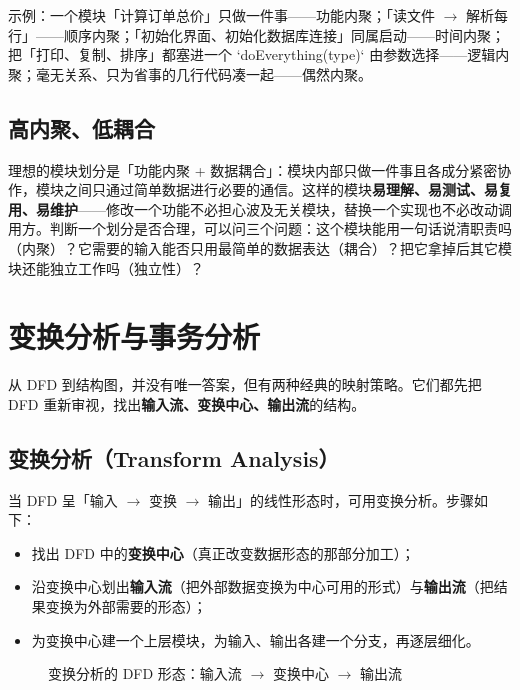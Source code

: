 示例：一个模块「计算订单总价」只做一件事——功能内聚；「读文件 $\to$ 解析每行」——顺序内聚；「初始化界面、初始化数据库连接」同属启动——时间内聚；把「打印、复制、排序」都塞进一个 `doEverything(type)` 由参数选择——逻辑内聚；毫无关系、只为省事的几行代码凑一起——偶然内聚。

\subsection{高内聚、低耦合}

理想的模块划分是「功能内聚 + 数据耦合」：模块内部只做一件事且各成分紧密协作，模块之间只通过简单数据进行必要的通信。这样的模块\textbf{易理解、易测试、易复用、易维护}——修改一个功能不必担心波及无关模块，替换一个实现也不必改动调用方。判断一个划分是否合理，可以问三个问题：这个模块能用一句话说清职责吗（内聚）？它需要的输入能否只用最简单的数据表达（耦合）？把它拿掉后其它模块还能独立工作吗（独立性）？

\section{变换分析与事务分析}

从 DFD 到结构图，并没有唯一答案，但有两种经典的映射策略。它们都先把 DFD 重新审视，找出\textbf{输入流、变换中心、输出流}的结构。

\subsection{变换分析（Transform Analysis）}

当 DFD 呈「输入 $\to$ 变换 $\to$ 输出」的线性形态时，可用变换分析。步骤如下：

\begin{itemize}
    \item 找出 DFD 中的\textbf{变换中心}（真正改变数据形态的那部分加工）；
    \item 沿变换中心划出\textbf{输入流}（把外部数据变换为中心可用的形式）与\textbf{输出流}（把结果变换为外部需要的形态）；
    \item 为变换中心建一个上层模块，为输入、输出各建一个分支，再逐层细化。
\end{itemize}

\begin{figure}[H]
\centering
{}
\caption{变换分析的 DFD 形态：输入流 $\to$ 变换中心 $\to$ 输出流}
\end{figure}


